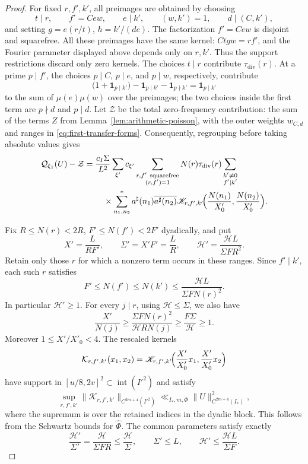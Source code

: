 \documentclass[11pt,a4paper]{article}
\numberwithin{equation}{section}
\numberwithin{figure}{section}
\theoremstyle{definition}
\theoremstyle{remark}
\newcommand{\ind}{\mathbf1}
\begin{document}
\begin{proof}
For fixed $r,f',k'$, all preimages are obtained by choosing
\[
 t\mid r,\qquad f'=Cew,\qquad e\mid k',\qquad
 (w,k')=1,\qquad d\mid(C,k'),
\]
and setting $g=e(r/t)$, $h=k'/(de)$.
The factorization $f'=Cew$ is disjoint and squarefree.
All these preimages have the same kernel: $Ctgw=rf'$, and the
Fourier parameter displayed above depends only on $r,k'$.
Thus the support restrictions discard only zero kernels.
The choices $t\mid r$ contribute $\tau_{\mathrm{div}}(r)$.
At a prime $p\mid f'$, the choices $p\mid C$, $p\mid e$, and
$p\mid w$, respectively, contribute
\[
 \bigl(1+\ind_{p\mid k'}\bigr)
       -\ind_{p\mid k'}-\ind_{p\nmid k'}=\ind_{p\mid k'}
\]
to the sum of $\mu(e)\mu(w)$ over the preimages; the two choices
inside the first term are $p\nmid d$ and $p\mid d$.
Let $\mathcal Z$ be the total zero-frequency contribution: the sum of the terms $Z$ from Lemma~\ref{lem:arithmetic-poisson}, with the outer weights $w_{C,d}$ and ranges in \eqref{eq:first-transfer-forms}.
Consequently, regrouping before taking absolute values gives
\[
 \begin{aligned}
 \mathcal Q_{\xi_1}(U)-\mathcal Z
 ={}&\frac{c_I\Sigma}{L^2}
 \sum_{\xi'}c_{\xi'}
 \sum_{\substack{r,f'\ \mathrm{squarefree}\\(r,f')=1}}
 N(r)\tau_{\mathrm{div}}(r)\sum_{\substack{k'\ne0\\f'\mid k'}}\\
 &\quad\times
 \sum_{n_1,n_2}^*a^\sharp(n_1)\overline{a^\sharp(n_2)}
 \mathscr K_{r,f',k'}\!\Bigl(\frac{N(n_1)}{X'_0},
                            \frac{N(n_2)}{X'_0}\Bigr).
 \end{aligned}
\]

Fix $R\le N(r)<2R$, $F'\le N(f')<2F'$ dyadically, and put
\[
 X'=\frac L{RF'},\qquad \Sigma'=X'F'=\frac LR,\qquad
 \mathcal H'=\frac{\mathcal H L}{\Sigma F R^2}.
\]
Retain only those $r$ for which a nonzero term occurs in these ranges.
Since $f'\mid k'$, each such $r$ satisfies
\[
 F'\le N(f')\le N(k')\le
 \frac{\mathcal H L}{\Sigma F N(r)^2}.
\]
In particular $\mathcal H'\ge1$. For every $j\mid r$, using $\mathcal H\le\Sigma$, we also have
\begin{equation}\label{eq:child-column-lower-bound}
 \frac{X'}{N(j)}
 \ge\frac{\Sigma F N(r)^2}{\mathcal H R N(j)}
 \ge\frac{F\Sigma}{\mathcal H}\ge1.
\end{equation}
Moreover $1\le X'/X'_0<4$. The rescaled kernels
\[
 \mathcal K_{r,f',k'}(x_1,x_2)
 =\mathscr K_{r,f',k'}\!\Bigl(\frac{X'}{X'_0}x_1,
                              \frac{X'}{X'_0}x_2\Bigr)
\]
have support in $[u/8,2v]^2\subset\operatorname{int}(I'^2)$ and satisfy
\[
 \sup_{r,f',k'}\|\mathcal K_{r,f',k'}\|_{C^{2m+4}(I'^2)}
 \ll_{I_*,m,\Phi}\|U\|_{C^{2m+4}(I_*)}^2,
\]
where the supremum is over the retained indices in the dyadic block.
This follows from the Schwartz bounds for $\widehat\Phi$.
The common parameters satisfy exactly
\[
 \frac{\mathcal H'}{\Sigma'}=
 \frac{\mathcal H}{\Sigma FR}\le\frac{\mathcal H}{\Sigma},\qquad
 \Sigma'\le L,\qquad
 \mathcal H'\le\frac{\mathcal H L}{\Sigma F}.
\]


\end{proof}
\end{document}
